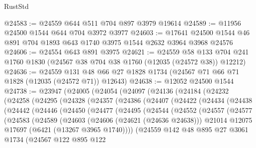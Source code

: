 \begin{lexlean}{RustStd}
\begin{coremodule}
@24583 := @24559 @644 @511 @704 @897 @3979 @19614
@24589 := @11956 @24500 @1544 @644 @704 @3972 @3977
@24603 := @17641 @24500 @1544 @46 @891 @704 @1893 @643 @1740 @3975 @1544 @2632 @3964 @3968 @24576
@24606 := @24554 @643 @891 @3975
@24621 := @24559
    @58
    @133
    @704
    @241
    @1760
    @1830
    (@24567 @38 @704 @38 @1760 (@12035 (@24572 @38)) @12212)
@24636 := @24559
    @131
    @48
    @66
    @27
    @1828
    @1734
    (@24567 @71 @66 @71 @1828 (@12035 (@24572 @71)) @12643)
@24638 := @12052 @24500 @1544
@24738 := @23947
    (@24005
      (@24054
        (@24097
          (@24136
            (@24184
              (@24232
                (@24258
                  (@24295
                    (@24328
                      (@24357
                        (@24386
                          (@24407
                            (@24422
                              (@24434
                                (@24438
                                  (@24442
                                    (@24446
                                      (@24450
                                        (@24477
                                          (@24495
                                            (@24544
                                              (@24552
                                                (@24557
                                                  (@24577
                                                    (@24583
                                                      (@24589
                                                        (@24603
                                                          (@24606 (@24621 (@24636 @24638)))
                                                          @21014
                                                          @12075
                                                          @17697
                                                          (@6421 (@13267 @3965 @1740))))
                                                      (@24559
                                                        @142
                                                        @48
                                                        @895
                                                        @27
                                                        @3061
                                                        @1734
                                                        (@24567
                                                          @122
                                                          @895
                                                          @122

\end{coremodule}
\end{lexlean}
